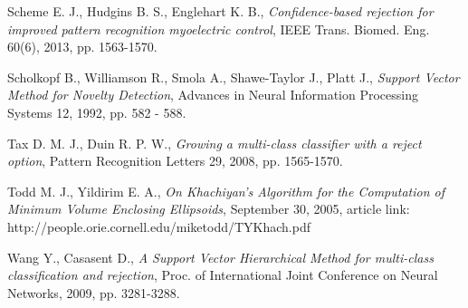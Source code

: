 \documentclass{llncs}
\begin{document}
\begin{thebibliography}{1}
Scheme E. J., Hudgins B. S., Englehart K. B., \emph{Confidence-based rejection for improved pattern recognition myoelectric control}, IEEE Trans. Biomed. Eng. 60(6), 2013, pp. 1563-1570.

Scholkopf B., Williamson R., Smola A., Shawe-Taylor J., Platt J., \emph{Support Vector Method for Novelty Detection}, Advances in Neural Information Processing Systems 12, 1992, pp. 582 - 588. 

Tax D. M. J., Duin R. P. W., \emph{Growing a multi-class classifier with a reject option}, Pattern Recognition Letters 29, 2008, pp. 1565-1570.

Todd M. J., Yildirim E. A., \emph{On Khachiyan's Algorithm for the Computation of Minimum Volume Enclosing Ellipsoids}, September 30, 2005, article link: http://people.orie.cornell.edu/miketodd/TYKhach.pdf

Wang Y., Casasent D., \emph{A Support Vector Hierarchical Method for multi-class classification and rejection}, Proc. of International Joint Conference on Neural Networks, 2009, pp. 3281-3288.

\end{thebibliography}
\end{document}
